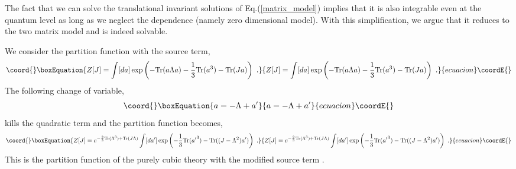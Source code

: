 \documentclass[a4paper,aps,preprint,nofootinbib,eqsecnum]{revtex4}
\begin{document}
\label{s:integrability} The fact that we can solve the translational
invariant solutions of Eq.(\ref{matrix_model}) implies that it is also
integrable even at the quantum level as long as we neglect the \coordHE{}
dependence (namely zero dimensional model). With this simplification, we
argue that it reduces to the two matrix model and is indeed solvable.

We consider the partition function with the source term,
\begin{equation}\coord{}\boxEquation{
Z[J]=\int [d{a}] \exp\left( - \mbox{Tr}({a}\Lambda{a}) -\frac{1}{3} \mbox{Tr}
({a}^3) -\mbox{Tr}(J{a}) \right)\,\,.
}{
Z[J]=\int [d{a}] \exp\left( - \mbox{Tr}({a}\Lambda{a}) -\frac{1}{3} \mbox{Tr}
({a}^3) -\mbox{Tr}(J{a}) \right)\,\,.
}{ecuacion}\coordE{}\end{equation}
The following change of variable,
\begin{equation}\coord{}\boxEquation{
{a}=-\Lambda+{a}^{\prime}
}{
{a}=-\Lambda+{a}^{\prime}
}{ecuacion}\coordE{}\end{equation}
kills the quadratic term and the partition function becomes,
\begin{equation}\coord{}\boxEquation{
Z[J]=e^{-\frac{2}{3}\mathrm{Tr}(\Lambda^3) + \mathrm{Tr} (J\Lambda)} \int [d{
a}^{\prime}] \exp\left( -\frac{1}{3}\mbox{Tr}({{a}^{\prime}}^3) - \mbox{Tr}
((J-\Lambda^2){a}^{\prime}) \right)\,\,.
}{
Z[J]=e^{-\frac{2}{3}\mathrm{Tr}(\Lambda^3) + \mathrm{Tr} (J\Lambda)} \int [d{
a}^{\prime}] \exp\left( -\frac{1}{3}\mbox{Tr}({{a}^{\prime}}^3) - \mbox{Tr}
((J-\Lambda^2){a}^{\prime}) \right)\,\,.
}{ecuacion}\coordE{}\end{equation}
This is the partition function of the purely cubic theory with the modified
source term \coordHE{}.
\end{document}
